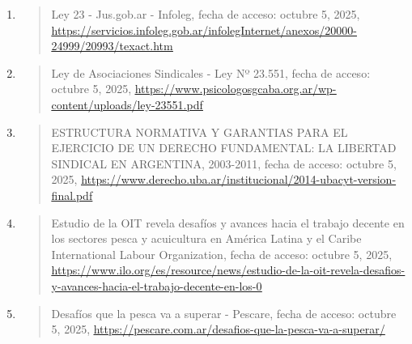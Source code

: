 \documentclass[]{article}
\begin{document}
\begin{enumerate}
\begin{quote}
  \end{quote}
\item
  \begin{quote}
  Ley 23 - Jus.gob.ar - Infoleg, fecha de acceso: octubre 5, 2025,
  \href{https://servicios.infoleg.gob.ar/infolegInternet/anexos/20000-24999/20993/texact.htm}{\uline{https://servicios.infoleg.gob.ar/infolegInternet/anexos/20000-24999/20993/texact.htm}}
  \end{quote}
\item
  \begin{quote}
  Ley de Asociaciones Sindicales - Ley Nº 23.551, fecha de acceso:
  octubre 5, 2025,
  \href{https://www.psicologosgcaba.org.ar/wp-content/uploads/ley-23551.pdf}{\uline{https://www.psicologosgcaba.org.ar/wp-content/uploads/ley-23551.pdf}}
  \end{quote}
\item
  \begin{quote}
  ESTRUCTURA NORMATIVA Y GARANTIAS PARA EL EJERCICIO DE UN DERECHO
  FUNDAMENTAL: LA LIBERTAD SINDICAL EN ARGENTINA, 2003-2011, fecha de
  acceso: octubre 5, 2025,
  \href{https://www.derecho.uba.ar/institucional/2014-ubacyt-version-final.pdf}{\uline{https://www.derecho.uba.ar/institucional/2014-ubacyt-version-final.pdf}}
  \end{quote}
\item
  \begin{quote}
  Estudio de la OIT revela desafíos y avances hacia el trabajo decente
  en los sectores pesca y acuicultura en América Latina y el Caribe
  \textbar{} International Labour Organization, fecha de acceso: octubre
  5, 2025,
  \href{https://www.ilo.org/es/resource/news/estudio-de-la-oit-revela-desafios-y-avances-hacia-el-trabajo-decente-en-los-0}{\uline{https://www.ilo.org/es/resource/news/estudio-de-la-oit-revela-desafios-y-avances-hacia-el-trabajo-decente-en-los-0}}
  \end{quote}
\item
  \begin{quote}
  Desafíos que la pesca va a superar - Pescare, fecha de acceso: octubre
  5, 2025,
  \href{https://pescare.com.ar/desafios-que-la-pesca-va-a-superar/}{\uline{https://pescare.com.ar/desafios-que-la-pesca-va-a-superar/}}
  \end{quote}
\end{enumerate}
\end{document}
